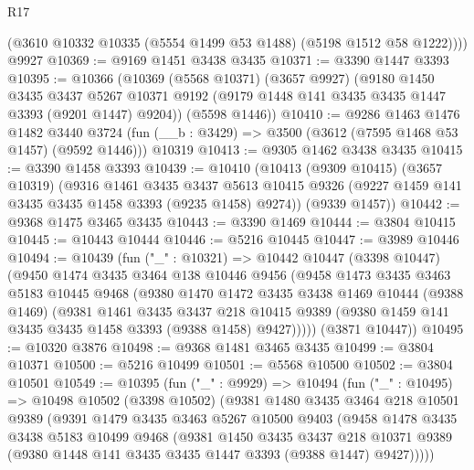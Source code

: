 \begin{lexlean}{R17}
\begin{coremodule}
        (@3610 @10332 @10335 (@5554 @1499 @53 @1488) (@5198 @1512 @58 @1222))))
    @9927
@10369 := @9169 @1451 @3438 @3435
@10371 := @3390 @1447 @3393
@10395 := @10366
    (@10369
      (@5568 @10371)
      (@3657 @9927)
      (@9180
        @1450
        @3435
        @3437
        @5267
        @10371
        @9192
        (@9179 @1448 @141 @3435 @3435 @1447 @3393 (@9201 @1447) @9204))
      (@5598 @1446))
@10410 := @9286
    @1463
    @1476
    @1482
    @3440
    @3724
    (fun (__b : @3429) => @3500 (@3612 (@7595 @1468 @53 @1457) (@9592 @1446)))
    @10319
@10413 := @9305 @1462 @3438 @3435
@10415 := @3390 @1458 @3393
@10439 := @10410
    (@10413
      (@9309 @10415)
      (@3657 @10319)
      (@9316
        @1461
        @3435
        @3437
        @5613
        @10415
        @9326
        (@9227 @1459 @141 @3435 @3435 @1458 @3393 (@9235 @1458) @9274))
      (@9339 @1457))
@10442 := @9368 @1475 @3465 @3435
@10443 := @3390 @1469
@10444 := @3804 @10415
@10445 := @10443 @10444
@10446 := @5216 @10445
@10447 := @3989 @10446
@10494 := @10439
    (fun ("_" : @10321) =>
    @10442
      @10447
      (@3398 @10447)
      (@9450
        @1474
        @3435
        @3464
        @138
        @10446
        @9456
        (@9458
          @1473
          @3435
          @3463
          @5183
          @10445
          @9468
          (@9380
            @1470
            @1472
            @3435
            @3438
            @1469
            @10444
            (@9388 @1469)
            (@9381
              @1461
              @3435
              @3437
              @218
              @10415
              @9389
              (@9380 @1459 @141 @3435 @3435 @1458 @3393 (@9388 @1458) @9427)))))
      (@3871 @10447))
@10495 := @10320 @3876
@10498 := @9368 @1481 @3465 @3435
@10499 := @3804 @10371
@10500 := @5216 @10499
@10501 := @5568 @10500
@10502 := @3804 @10501
@10549 := @10395
    (fun ("_" : @9929) =>
    @10494
      (fun ("_" : @10495) =>
      @10498
        @10502
        (@3398 @10502)
        (@9381
          @1480
          @3435
          @3464
          @218
          @10501
          @9389
          (@9391
            @1479
            @3435
            @3463
            @5267
            @10500
            @9403
            (@9458
              @1478
              @3435
              @3438
              @5183
              @10499
              @9468
              (@9381
                @1450
                @3435
                @3437
                @218
                @10371
                @9389
                (@9380 @1448 @141 @3435 @3435 @1447 @3393 (@9388 @1447) @9427)))))

\end{coremodule}
\end{lexlean}
